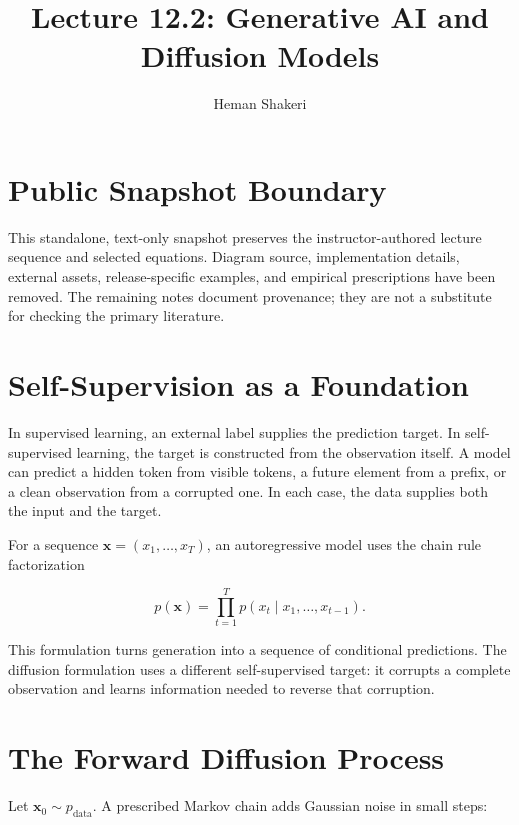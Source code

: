 \documentclass{article}
\title{Lecture 12.2: Generative AI and Diffusion Models}
\author{Heman Shakeri}
\date{}
\begin{document}
\maketitle

\section*{Public Snapshot Boundary}

This standalone, text-only snapshot preserves the instructor-authored lecture sequence
and selected equations. Diagram source, implementation details, external assets,
release-specific examples, and empirical prescriptions have been removed. The
remaining notes document provenance; they are not a substitute for checking the
primary literature.

\section{Self-Supervision as a Foundation}

In supervised learning, an external label supplies the prediction target. In
self-supervised learning, the target is constructed from the observation itself. A
model can predict a hidden token from visible tokens, a future element from a prefix,
or a clean observation from a corrupted one. In each case, the data supplies both the
input and the target.

For a sequence $\mathbf{x}=(x_1,\ldots,x_T)$, an autoregressive model uses the chain
rule factorization

\[
p(\mathbf{x})=\prod_{t=1}^{T}p(x_t\mid x_1,\ldots,x_{t-1}).
\]

This formulation turns generation into a sequence of conditional predictions. The
diffusion formulation uses a different self-supervised target: it corrupts a complete
observation and learns information needed to reverse that corruption.


\section{The Forward Diffusion Process}

Let $\mathbf{x}_0\sim p_{\mathrm{data}}$. A prescribed Markov chain adds Gaussian
noise in small steps:
\end{document}
